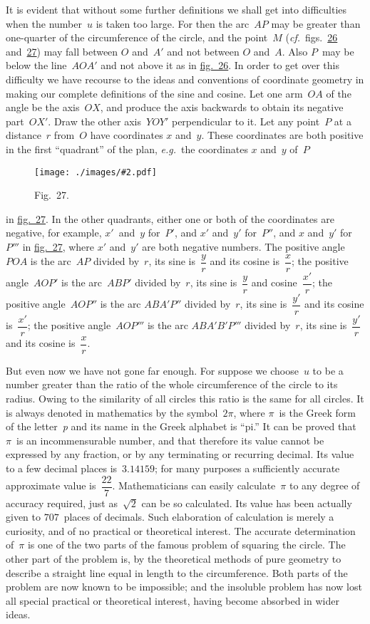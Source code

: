 \documentclass[12pt,leqno]{book}[2005/09/16]
\newcommand{\Graphic}[2]{%
  \phantomsection\label{fig:#2}%
  \texttt{[image: ./images/\#2.pdf]}%
}
\newcommand{\DefWidth}{4in}%
\newcommand{\Figure}[2][\DefWidth]{%
  \begin{figure}[hbt!]
    \centering
    \phantomsection\label{fig:#2}
    \Graphic{#1}{fig#2}
    \caption{Fig.~#2.}
  \end{figure}\ignorespaces%
}
\newcommand{\FigNum}[1]{\hyperref[fig:#1]{#1}}
\newcommand{\Fig}[2][Fig.]{\hyperref[fig:#2]{#1~#2}}
\newcommand{\PageSep}[1]{\ignorespaces}
\newcommand{\cf}{\emph{cf.}}
\newcommand{\eg}{\emph{e.g.}}
\newcommand{\Foreign}[1]{\textit{#1}}
\begin{document}
It is evident that without some further definitions
we shall get into difficulties when the
number~$u$ is taken too large. For then the arc~$AP$
may be greater than one-quarter of the
circumference of the circle, and the point~$M$
(\cf\ figs.\ \FigNum{26} and~\FigNum{27}) may fall between $O$ and~$A'$
and not between $O$ and~$A$. Also $P$~may be
below the line~$AOA'$ and not above it as in
\Fig[fig.]{26}. In order to get over this difficulty
we have recourse to the ideas and conventions
of coordinate geometry in making our
complete definitions of the sine and cosine.
Let one arm~$OA$ of the angle be the axis~$OX$,
and produce the axis backwards to
obtain its negative part~$OX'$. Draw the
\PageSep{185}
other axis~$YOY'$ perpendicular to it. Let
any point~$P$ at a distance~$r$ from~$O$ have
coordinates $x$ and~$y$. These coordinates are
both positive in the first ``quadrant'' of
the plan, \eg\ the coordinates $x$ and~$y$ of~$P$
\Figure{27}
in \Fig[fig.]{27}. In the other quadrants, either
one or both of the coordinates are negative,
for example, $x'$~and~$y$ for~$P'$, and $x'$ and~$y'$
for~$P''$, and $x$ and~$y'$ for~$P'''$ in \Fig[fig.]{27}, where
$x'$ and~$y'$ are both negative numbers. The
positive angle~$POA$ is the arc~$AP$ divided
by~$r$, its sine is~$\dfrac{y}{r}$ and its cosine is~$\dfrac{x}{r}$; the positive
\PageSep{186}
angle~$AOP'$ is the arc~$ABP'$ divided by~$r$,
its sine is~$\dfrac{y}{r}$ and cosine~$\dfrac{x'}{r}$; the positive angle~$AOP''$
is the arc $ABA'P''$ divided by~$r$, its
sine is~$\dfrac{y'}{r}$ and its cosine is~$\dfrac{x'}{r}$; the positive
angle~$AOP'''$ is the arc $ABA'B'P'''$ divided
by~$r$, its sine is~$\dfrac{y'}{r}$ and its cosine is~$\dfrac{x}{r}$.

But even now we have not gone far enough.
For suppose we choose~$u$ to be a number
greater than the ratio of the whole circumference
of the circle to its radius. Owing to
the similarity of all circles this ratio is the
same for all circles. It is always denoted in
mathematics by the symbol~$2\pi$, where $\pi$~is
the Greek form of the letter~\Foreign{p} and its
name in the Greek alphabet is ``pi.'' It can
be proved that $\pi$~is an incommensurable
number, and that therefore its value cannot
be expressed by any fraction, or by any
terminating or recurring decimal. Its value
to a few decimal places is~$3.14159$; for many
purposes a sufficiently accurate approximate
value is~$\dfrac{22}{7}$. Mathematicians can easily calculate~$\pi$
to any degree of accuracy required,
just as~$\sqrt{2}$ can be so calculated. Its value
has been actually given to $707$~places of
\PageSep{187}
decimals. Such elaboration of calculation is
merely a curiosity, and of no practical or
theoretical interest. The accurate determination
of~$\pi$ is one of the two parts of
the famous problem of squaring the circle.
%
The other part of the problem is, by the
theoretical methods of pure geometry to
describe a straight line equal in length to the
circumference. Both parts of the problem
are now known to be impossible; and the
insoluble problem has now lost all special
practical or theoretical interest, having become
absorbed in wider ideas.
\end{document}
